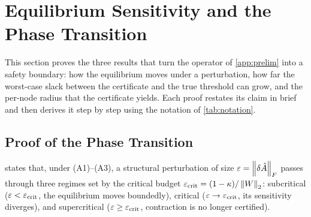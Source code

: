 \section{Equilibrium Sensitivity and the Phase Transition}
\label{app:proofs}

This section proves the three results that turn the operator of \cref{app:prelim} into a safety
boundary: how the equilibrium moves under a perturbation, how far the worst-case slack between the
certificate and the true threshold can grow, and the per-node radius that the certificate yields. Each
proof restates its claim in brief and then derives it step by step using the notation of
\cref{tab:notation}.

\subsection{Proof of the Phase Transition}
\label{app:proof_phase}

 states that, under (A1)--(A3), a structural perturbation of size
$\varepsilon=\left\|\delta\hat{A}\right\|_F$ passes through three regimes set by the critical budget
$\varepsilon_{\mathrm{crit}}=(1-\kappa)/\left\|W\right\|_2$: subcritical ($\varepsilon<\varepsilon_{\mathrm{crit}}$, the equilibrium moves boundedly),
critical ($\varepsilon\to\varepsilon_{\mathrm{crit}}$, its sensitivity diverges), and supercritical
($\varepsilon\ge\varepsilon_{\mathrm{crit}}$, contraction is no longer certified).

